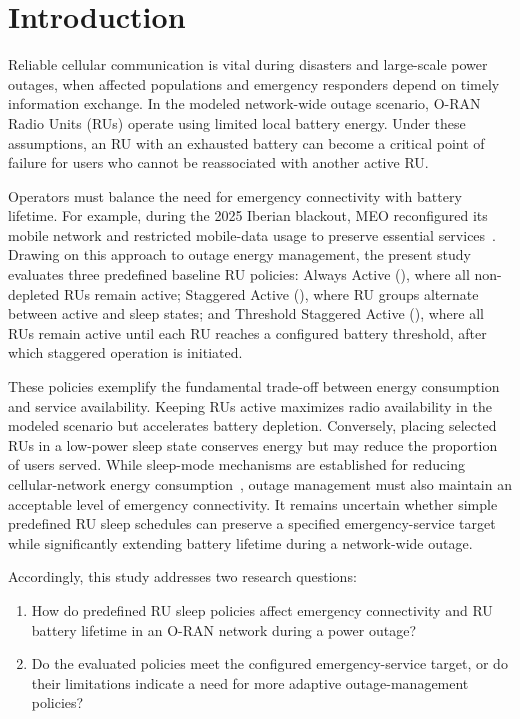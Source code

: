 \section{Introduction}

Reliable cellular communication is vital during disasters and large-scale power outages, when affected populations and emergency responders depend on timely information exchange. In the modeled network-wide outage scenario, O-RAN Radio Units (RUs) operate using limited local battery energy. Under these assumptions, an RU with an exhausted battery can become a critical point of failure for users who cannot be reassociated with another active RU.

Operators must balance the need for emergency connectivity with battery lifetime. For example, during the 2025 Iberian blackout, MEO reconfigured its mobile network and restricted mobile-data usage to preserve essential services~\cite{lusa2025meo}. Drawing on this approach to outage energy management, the present study evaluates three predefined baseline RU policies: Always Active (), where all non-depleted RUs remain active; Staggered Active (), where RU groups alternate between active and sleep states; and Threshold Staggered Active (), where all RUs remain active until each RU reaches a configured battery threshold, after which staggered operation is initiated.

These policies exemplify the fundamental trade-off between energy consumption and service availability. Keeping RUs active maximizes radio availability in the modeled scenario but accelerates battery depletion. Conversely, placing selected RUs in a low-power sleep state conserves energy but may reduce the proportion of users served. While sleep-mode mechanisms are established for reducing cellular-network energy consumption~\cite{wu2015sleep}, outage management must also maintain an acceptable level of emergency connectivity. It remains uncertain whether simple predefined RU sleep schedules can preserve a specified emergency-service target while significantly extending battery lifetime during a network-wide outage.

Accordingly, this study addresses two research questions:
\begin{enumerate}
    \item How do predefined RU sleep policies affect emergency connectivity and RU battery lifetime in an O-RAN network during a power outage?
    \item Do the evaluated policies meet the configured emergency-service target, or do their limitations indicate a need for more adaptive outage-management policies?
\end{enumerate}

